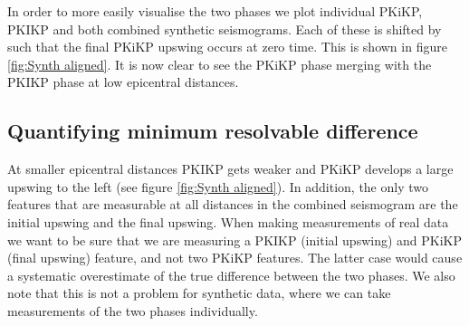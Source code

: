 \documentclass[11pt,a4paper]{article}
\begin{document}
In order to more easily visualise the two phases we plot individual PKiKP, PKIKP and both combined synthetic seismograms. Each of these is shifted by such that the final PKiKP upswing occurs at zero time. This is shown in figure \ref{fig:Synth aligned}. It is now clear to see the PKiKP phase merging with the PKIKP phase at low epicentral distances.

\subsection{Quantifying minimum resolvable difference}
At smaller epicentral distances PKIKP gets weaker and PKiKP develops a large upswing to the left (see figure \ref{fig:Synth aligned}). In addition, the only two features that are measurable at all distances in the combined seismogram are the initial upswing and the final upswing. When making measurements of real data we want to be sure that we are measuring a PKIKP (initial upswing) and PKiKP (final upswing) feature, and not two PKiKP features. The latter case would cause a systematic overestimate of the true difference between the two phases. We also note that this is not a problem for synthetic data, where we can take measurements of the two phases individually.
\end{document}
